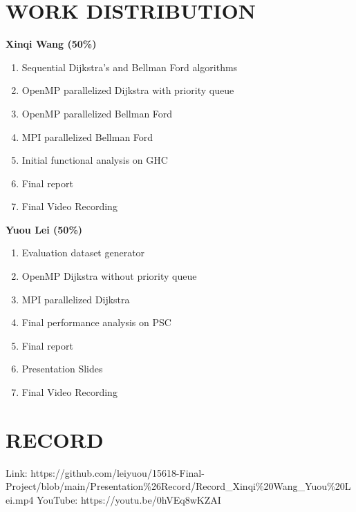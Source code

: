 \documentclass[12pt]{article}
\begin{document}
\section{WORK DISTRIBUTION}
\textbf{Xinqi Wang (50\%)}
\begin{enumerate}
    \item Sequential Dijkstra's and Bellman Ford algorithms
    \item OpenMP parallelized Dijkstra with priority queue
    \item OpenMP parallelized Bellman Ford
    \item MPI parallelized Bellman Ford
    \item Initial functional analysis on GHC
    \item Final report
    \item Final Video Recording
\end{enumerate}

\textbf{Yuou Lei (50\%)}
\begin{enumerate}
    \item Evaluation dataset generator
    \item OpenMP Dijkstra without priority queue
    \item MPI parallelized Dijkstra
    \item Final performance analysis on PSC
    \item Final report
    \item Presentation Slides
    \item Final Video Recording
\end{enumerate}
\section{RECORD}
Link: https://github.com/leiyuou/15618-Final-Project/blob/main/Presentation\%26Record/Record\_Xinqi\%20Wang\_Yuou\%20Lei.mp4
YouTube: https://youtu.be/0hVEq8wKZAI
\end{document}
